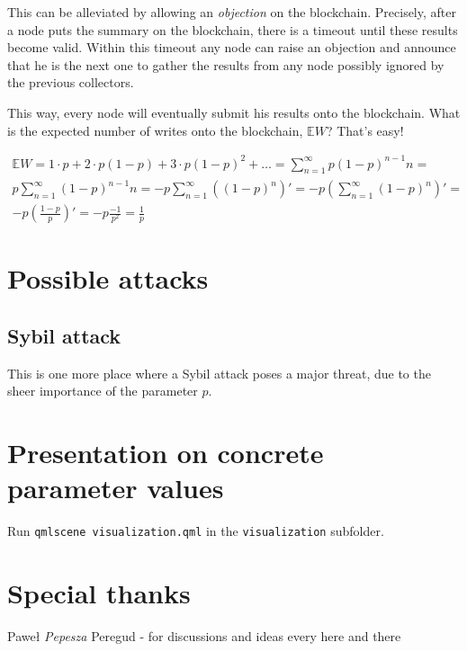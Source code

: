 \documentclass[12pt]{article}
\begin{document}
This can be alleviated by allowing an \textit{objection} on the blockchain.
Precisely, after a node puts the summary on the blockchain, there is a 
timeout until these results become valid. Within this timeout any node can
raise an objection and announce that he is the next one to gather the results
from any node possibly ignored by the previous collectors.

This way, every node will eventually submit his results onto the blockchain.
What is the expected number of writes onto the blockchain, $\mathbb{E}W$? That's easy!

\begin{multline}
\mathbb{E}W = 1 \cdot p + 2 \cdot p (1-p) + 3 \cdot p (1-p)^2 + \dots = \sum_{n=1}^{\infty} p (1-p)^{n-1} n = \\
p \sum_{n=1}^{\infty} (1-p)^{n-1} n = -p \sum_{n=1}^{\infty} \left((1-p)^n\right)' = -p \left( \sum_{n=1}^{\infty}(1-p)^n\right)' = \\
-p \left(\frac{1-p}{p}\right)' = -p \frac{-1}{p^2} = \frac{1}{p}
\end{multline}
\section{Possible attacks}
\subsection{Sybil attack}
This is one more place where a Sybil attack poses a major threat, due to the sheer
importance of the parameter $p$.
 
\section{Presentation on concrete parameter values}
Run \texttt{qmlscene visualization.qml} in the \texttt{visualization} subfolder.

\section{Special thanks}
Paweł \textit{Pepesza} Peregud - for discussions and ideas every here and there 
\end{document}
